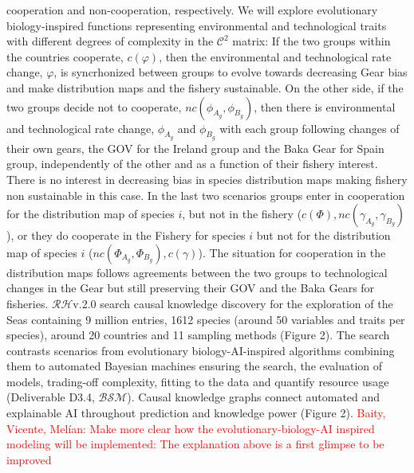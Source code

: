 \documentclass[11pt, a4paper]{article} %
\begin{document}
{cooperation and non-cooperation, respectively. We will explore
evolutionary biology-inspired functions representing environmental and
technological traits with different degrees of complexity in the
$\mathcal{C}^2$ matrix: If the two groups within the countries
cooperate, $c(\varphi)$, then the environmental and technological rate
change, $\varphi$, is syncrhonized between groups to evolve towards
decreasing Gear bias and make distribution maps and the fishery
sustainable. On the other side, if the two groups decide not to
cooperate, $nc(\phi_{A_{g}},\phi_{B_{g}})$, then there is
environmental and technological rate change, $\phi_{A_{g}}$ and
$\phi_{B_{g}}$ with each group following changes of their own gears,
the GOV for the Ireland group and the Baka Gear for Spain group,
independently of the other and as a function of their fishery
interest. There is no interest in decreasing bias in species
distribution maps making fishery non sustainable in this case. In the
last two scenarios groups enter in cooperation for the distribution
map of species $i$, but not in the fishery
($c(\Phi), nc(\gamma_{A_{g}},\gamma_{B_{g}})$), or they do cooperate
in the Fishery for species $i$ but not for the distribution map of
species $i$ ($nc(\Phi_{A_{g}},\Phi_{B_{g}}), c(\gamma)$). The
situation for cooperation in the distribution maps follows agreements
between the two groups to technological changes in the Gear but still
preserving their GOV and the Baka Gears for
fisheries. $\mathcal{RH}$v.2.0 search causal knowledge discovery for
the exploration of the Seas containing 9 million entries, 1612 species
(around 50 variables and traits per species), around 20 countries and
11 sampling methods (Figure 2). The search contrasts scenarios from
evolutionary biology-AI-inspired algorithms combining them to
automated Bayesian machines ensuring the search, the evaluation of
models, trading-off complexity, fitting to the data and quantify
resource usage (Deliverable D3.4,
$\mathcal{BSM}$)\citep{Guimera2020,Steinruecken}. Causal knowledge
graphs connect automated and explainable AI throughout prediction and
knowledge power (Figure 2).} \textcolor{red}{Baity, Vicente, Mel\'ian:
Make more clear how the evolutionary-biology-AI inspired modeling will
be implemented: The explanation above is a first glimpse to be
improved}
\end{document}
